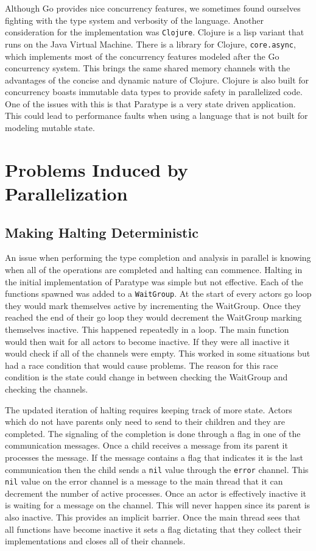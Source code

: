 \documentclass{acm_proc_article-sp}
\begin{document}

Although Go provides nice concurrency features, we sometimes found ourselves fighting with the type system and verbosity of the language. Another consideration for the implementation was \texttt{Clojure}. Clojure is a lisp variant that runs on the Java Virtual Machine. There is a library for Clojure, \texttt{core.async}, which implements most of the concurrency features modeled after the Go concurrency system. This brings the same shared memory channels with the advantages of the concise and dynamic nature of Clojure. Clojure is also built for concurrency boasts immutable data types to provide safety in parallelized code. One of the issues with this is that Paratype is a very state driven application. This could lead to performance faults when using a language that is not built for modeling mutable state.

\section{Problems Induced by Parallelization}
	\subsection{Making Halting Deterministic}
		An issue when performing the type completion and analysis in parallel is knowing when all of the operations are completed and halting can commence. Halting in the initial implementation of Paratype was simple but not effective. Each of the functions spawned was added to a \texttt{WaitGroup}. At the start of every actors go loop they would mark themselves active by incrementing the WaitGroup. Once they reached the end of their go loop they would decrement the WaitGroup marking themselves inactive. This happened repeatedly in a loop. The main function would then wait for all actors to become inactive. If they were all inactive it would check if all of the channels were empty. This worked in some situations but had a race condition that would cause problems. The reason for this race condition is the state could change in between checking the WaitGroup and checking the channels.

		The updated iteration of halting requires keeping track of more state. Actors which do not have parents only need to send to their children and they are completed. The signaling of the completion is done through a flag in one of the communication messages. Once a child receives a message from its parent it processes the message. If the message contains a flag that indicates it is the last communication then the child sends a \lstinline!nil! value through the \lstinline!error! channel. This \lstinline!nil! value on the error channel is a message to the main thread that it can decrement the number of active processes. Once an actor is effectively inactive it is waiting for a message on the channel. This will never happen since its parent is also inactive. This provides an implicit barrier. Once the main thread sees that all functions have become inactive it sets a flag dictating that they collect their implementations and closes all of their channels.
\end{document}
